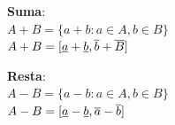 \documentclass{article}
\begin{document}
\begin{flushleft}
\textbf{Suma}: 
\\
$A + B = \{a + b : a \in A, b \in B \}$ \\
$A + B =[\uline a + \uline b, \overline{b} +\overline{B} ]$ \\
            
\end{flushleft}        
    
    
\begin{flushleft}

\textbf{Resta}:
    \\
    $A - B = \{ a - b : a \in A, b \in B \}$ \\
    $A - B =[\uline a - \uline b, \overline{a} -\overline{b} ]$ \\

\end{flushleft}
\newpage
\end{document}
